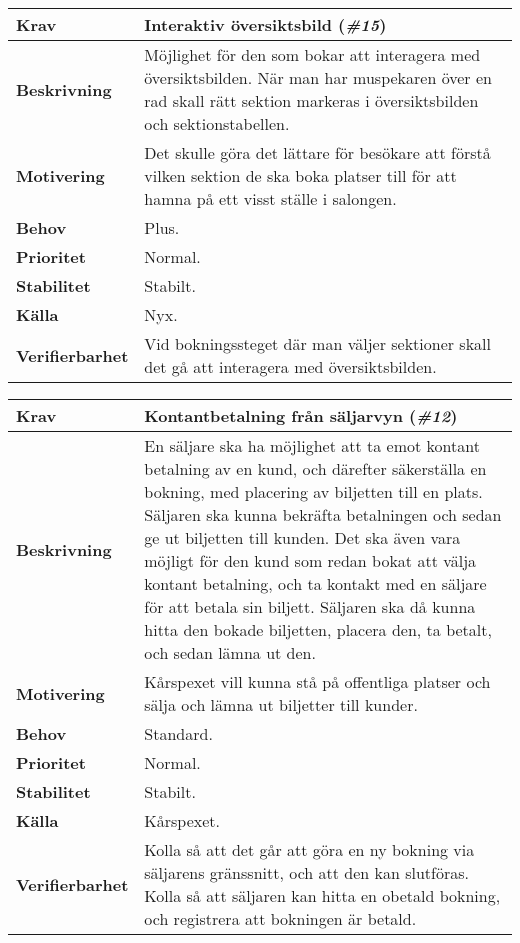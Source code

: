 \documentclass[a4paper, twoside, 11pt, titlepage]{article}
\begin{document}
		\begin{tabular} { p{2.6cm} p{12.5cm} }
			\hline
			\sffamily\textbf{Krav} & Interaktiv översiktsbild (\emph{\#15})  \\
			\hline
			\sffamily\textbf{Beskrivning} & Möjlighet för den som bokar att interagera med översiktsbilden. När man har muspekaren över en rad skall rätt sektion markeras i översiktsbilden och sektionstabellen.  \\
			\hline
			\sffamily\textbf{Motivering} & Det skulle göra det lättare för besökare att förstå vilken sektion de ska boka platser till för att hamna på ett visst ställe i salongen.  \\
			\hline
			\sffamily\textbf{Behov} & Plus.  \\
			\hline
			\sffamily\textbf{Prioritet} & Normal.  \\
			\hline
			\sffamily\textbf{Stabilitet} & Stabilt.  \\
			\hline
			\sffamily\textbf{Källa} & Nyx.  \\
			\hline
			\sffamily\textbf{Verifierbarhet} & Vid bokningssteget där man väljer sektioner skall det gå att interagera med översiktsbilden.  \\
			\hline
		\end{tabular}
		\vspace{6mm}

		\begin{tabular} { p{2.6cm} p{12.5cm} }
			\hline
			\sffamily\textbf{Krav} & Kontantbetalning från säljarvyn (\emph{\#12})  \\
			\hline
			\sffamily\textbf{Beskrivning} & En säljare ska ha möjlighet att ta emot kontant betalning av en kund, och därefter säkerställa en bokning, med placering av biljetten till en plats. Säljaren ska kunna bekräfta betalningen och sedan ge ut biljetten till kunden. Det ska även vara möjligt för den kund som redan bokat att välja kontant betalning, och ta kontakt med en säljare för att betala sin biljett. Säljaren ska då kunna hitta den bokade biljetten, placera den, ta betalt, och sedan lämna ut den.  \\
			\hline
			\sffamily\textbf{Motivering} & Kårspexet vill kunna stå på offentliga platser och sälja och lämna ut biljetter till kunder.  \\
			\hline
			\sffamily\textbf{Behov} & Standard.  \\
			\hline
			\sffamily\textbf{Prioritet} & Normal.  \\
			\hline
			\sffamily\textbf{Stabilitet} & Stabilt.  \\
			\hline
			\sffamily\textbf{Källa} & Kårspexet.  \\
			\hline
			\sffamily\textbf{Verifierbarhet} & Kolla så att det går att göra en ny bokning via säljarens gränssnitt, och att den kan slutföras. Kolla så att säljaren kan hitta en obetald bokning, och registrera att bokningen är betald.  \\
			\hline
		\end{tabular}
		\vspace{6mm}
\end{document}
